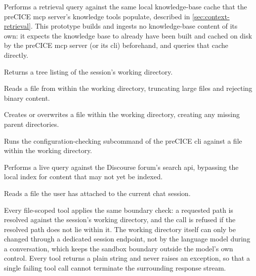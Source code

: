 \documentclass[
  numbers=noenddot,
  english,
  a4paper,
  twoside,
  bibliography=totoc,
  headsepline,
  cleardoublepage=empty,
  parskip=half,
  draft=false
]{scrbook}
\theoremstyle{break}
\renewcommand{\_}{\textunderscore\allowbreak}
\begin{document}
\begin{description}[font=\ttfamily]
  \item[search\_precice\_docs] Performs a retrieval query against the same local knowledge-base
        cache that the preCICE \gls{mcp} server's knowledge tools populate, described in
        \cref{sec:context-retrieval}.
        This prototype builds and ingests no knowledge-base content of its own: it expects the
        knowledge base to already have been built and cached on disk by the preCICE \gls{mcp}
        server (or its \gls{cli}) beforehand, and queries that cache directly.
  \item[list\_project\_files] Returns a tree listing of the session's working directory.
  \item[read\_project\_file] Reads a file from within the working directory, truncating large
        files and rejecting binary content.
  \item[write\_project\_file] Creates or overwrites a file within the working directory,
        creating any missing parent directories.
  \item[validate\_precice\_config] Runs the configuration-checking subcommand of the preCICE
        \gls{cli} against a file within the working directory.
  \item[search\_forum\_live] Performs a live query against the Discourse forum's search
        \gls{api}, bypassing the local index for content that may not yet be indexed.
  \item[read\_attached\_file] Reads a file the user has attached to the current chat session.
\end{description}

Every file-scoped tool applies the same boundary check: a requested path is resolved against
the session's working directory, and the call is refused if the resolved path does not lie
within it.
The working directory itself can only be changed through a dedicated session endpoint, not by
the language model during a conversation, which keeps the sandbox boundary outside the model's
own control.
Every tool returns a plain string and never raises an exception, so that a single failing tool
call cannot terminate the surrounding response stream.
\end{document}
